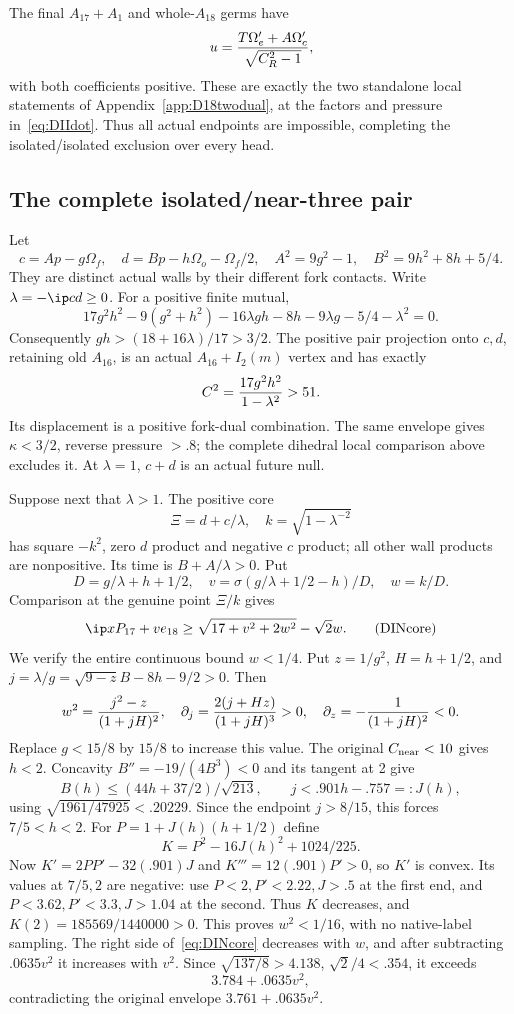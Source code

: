 The final \(A_{17}+A_1\) and whole-\(A_{18}\) germs have
\[
 u={T\Omega'_e+A\Omega'_c\over\sqrt{C_R^2-1}},
\]
with both coefficients positive.
These are exactly the two standalone local statements of
Appendix~\ref{app:D18twodual}, at the factors and pressure
in~\eqref{eq:DIIdot}.
Thus all actual endpoints are impossible, completing the
isolated/isolated exclusion over every head.

\subsection{The complete isolated/near-three pair}
\label{app:D18isolatednear}

Let
\[
 c=Ap-g\Omega_f,\quad
 d=Bp-h\Omega_o-\Omega_f/2,\quad
 A^2=9g^2-1,\quad B^2=9h^2+8h+5/4 .
\]
They are distinct actual walls by their different fork contacts.
Write \(\lambda=-\ip cd\ge0\).
For a positive finite mutual,
\[
 17g^2h^2-9(g^2+h^2)-16\lambda gh
       -8h-9\lambda g-5/4-\lambda^2=0.
\]
Consequently \(gh>(18+16\lambda)/17>3/2\).
The positive pair projection onto \(c,d\), retaining old \(A_{16}\),
is an actual \(A_{16}+I_2(m)\) vertex and has exactly
\[
                  C^2={17g^2h^2\over1-\lambda^2}>51.
\]
Its displacement is a positive fork-dual combination.
The same envelope gives \(\kappa<3/2\), reverse pressure \(>.8\);
the complete dihedral local comparison above excludes it.
At \(\lambda=1\), \(c+d\) is an actual future null.

Suppose next that \(\lambda>1\).
The positive core
\[
 \Xi=d+c/\lambda,\quad k=\sqrt{1-\lambda^{-2}}
\]
has square \(-k^2\), zero \(d\) product and negative \(c\)
product; all other wall products are nonpositive.
Its time is \(B+A/\lambda>0\).
Put
\[
 D=g/\lambda+h+1/2,\quad
 v=\sigma(g/\lambda+1/2-h)/D,\quad w=k/D.
\]
Comparison at the genuine point \(\Xi/k\) gives
\[
 \ip x{P_{17}+ve_{18}}
 \ge\sqrt{17+v^2+2w^2}-\sqrt2w .
\tag{DINcore}\label{eq:DINcore}
\]
We verify the entire continuous bound \(w<1/4\).
Put \(z=1/g^2\), \(H=h+1/2\), and
\(j=\lambda/g=\sqrt{9-z}B-8h-9/2>0\).
Then
\[
 w^2={j^2-z\over(1+jH)^2},\quad
 \partial_j={2(j+Hz)\over(1+jH)^3}>0,\quad
 \partial_z=-{1\over(1+jH)^2}<0 .
\]
Replace \(g<15/8\) by \(15/8\) to increase this value.
The original \(C_{\rm near}<10\) gives \(h<2\).
Concavity \(B''=-19/(4B^3)<0\) and its tangent at 2 give
\[
 B(h)\le(44h+37/2)/\sqrt{213},\qquad
 j<.901h-.757=:J(h),
\]
using \(\sqrt{1961/47925}<.20229\).
Since the endpoint \(j>8/15\), this forces \(7/5<h<2\).
For \(P=1+J(h)(h+1/2)\) define
\[
 K=P^2-16J(h)^2+1024/225 .
\]
Now \(K'=2PP'-32(.901)J\) and
\(K'''=12(.901)P'>0\), so \(K'\) is convex.
Its values at \(7/5,2\) are negative:
use \(P<2,P'<2.22,J>.5\) at the first end,
and \(P<3.62,P'<3.3,J>1.04\) at the second.
Thus \(K\) decreases, and
\(K(2)=185569/1440000>0\).
This proves \(w^2<1/16\), with no native-label sampling.
The right side of~\eqref{eq:DINcore} decreases with \(w\),
and after subtracting \(.0635v^2\) it increases with \(v^2\).
Since \(\sqrt{137/8}>4.138\), \(\sqrt2/4<.354\), it exceeds
\[
                3.784+.0635v^2,
\]
contradicting the original envelope
\(3.761+.0635v^2\).

